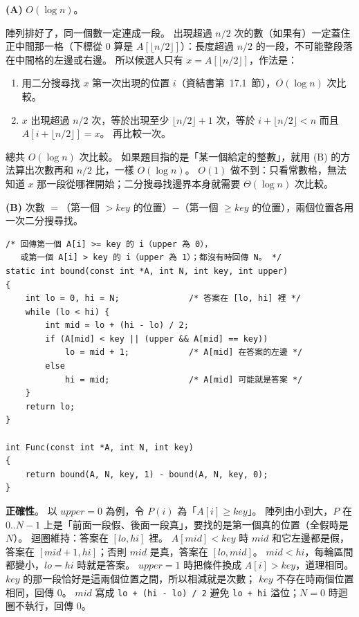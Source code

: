 \begin{pastsoln}
\textbf{(A)} $O(\log n)$。

陣列排好了，同一個數一定連成一段。 出現超過 $n/2$ 次的數（如果有）一定蓋住正中間那一格（下標從 $0$
算是 $A[\lfloor n/2\rfloor]$）：長度超過 $n/2$ 的一段，不可能整段落在中間格的左邊或右邊。 所以候選人只有
$x = A[\lfloor n/2\rfloor]$，作法是：
\begin{enumerate}
\item 用二分搜尋找 $x$ 第一次出現的位置 $i$（資結書第~17.1~節），$O(\log n)$ 次比較。
\item $x$ 出現超過 $n/2$ 次，等於出現至少 $\lfloor n/2\rfloor + 1$ 次，等於
$i + \lfloor n/2\rfloor < n$ 而且 $A[i + \lfloor n/2\rfloor] = x$。 再比較一次。
\end{enumerate}
總共 $O(\log n)$ 次比較。 如果題目指的是「某一個給定的整數」，就用 (B) 的方法算出次數再和 $n/2$ 比，一樣
$O(\log n)$。 $O(1)$ 做不到：只看常數格，無法知道 $x$ 那一段從哪裡開始；二分搜尋找邊界本身就需要
$\Theta(\log n)$ 次比較。

\textbf{(B)} 次數 $=$（第一個 $> \mathit{key}$ 的位置）$-$（第一個 $\ge \mathit{key}$ 的位置），兩個位置各用
一次二分搜尋找。

\begin{verbatim}
/* 回傳第一個 A[i] >= key 的 i（upper 為 0），
   或第一個 A[i] > key 的 i（upper 為 1）；都沒有時回傳 N。 */
static int bound(const int *A, int N, int key, int upper)
{
    int lo = 0, hi = N;              /* 答案在 [lo, hi] 裡 */
    while (lo < hi) {
        int mid = lo + (hi - lo) / 2;
        if (A[mid] < key || (upper && A[mid] == key))
            lo = mid + 1;            /* A[mid] 在答案的左邊 */
        else
            hi = mid;                /* A[mid] 可能就是答案 */
    }
    return lo;
}

int Func(const int *A, int N, int key)
{
    return bound(A, N, key, 1) - bound(A, N, key, 0);
}
\end{verbatim}

\textbf{正確性}。 以 $\mathit{upper} = 0$ 為例，令 $P(i)$ 為「$A[i] \ge \mathit{key}$」。 陣列由小到大，$P$ 在
$0..N-1$ 上是「前面一段假、後面一段真」，要找的是第一個真的位置（全假時是 $N$）。 迴圈維持：答案在
$[\mathit{lo}, \mathit{hi}]$ 裡。 $A[\mathit{mid}] < \mathit{key}$ 時 $\mathit{mid}$ 和它左邊都是假，答案在
$[\mathit{mid}+1, \mathit{hi}]$；否則 $\mathit{mid}$ 是真，答案在 $[\mathit{lo}, \mathit{mid}]$。 $\mathit{mid} <
\mathit{hi}$，每輪區間都變小，$\mathit{lo} = \mathit{hi}$ 時就是答案。 $\mathit{upper} = 1$ 時把條件換成
$A[i] > \mathit{key}$，道理相同。 $\mathit{key}$ 的那一段恰好是這兩個位置之間，所以相減就是次數；
$\mathit{key}$ 不存在時兩個位置相同，回傳 $0$。 $\mathit{mid}$ 寫成 \texttt{lo + (hi - lo) / 2} 避免
\texttt{lo + hi} 溢位；$N = 0$ 時迴圈不執行，回傳 $0$。


\end{pastsoln}
